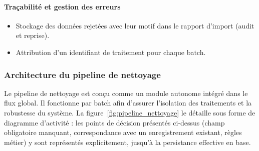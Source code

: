 \paragraph{Traçabilité et gestion des erreurs}
\begin{itemize}
    \item Stockage des données rejetées avec leur motif dans le rapport d'import (audit et reprise).

    \item Attribution d’un identifiant de traitement pour chaque batch.
\end{itemize}

\subsubsection{Architecture du pipeline de nettoyage}

Le pipeline de nettoyage est conçu comme un module autonome intégré dans le flux global. Il fonctionne par batch afin d’assurer l’isolation des traitements et la robustesse du système. La figure~\ref{fig:pipeline_nettoyage} le détaille sous forme de diagramme d'activité : les points de décision présentés ci-dessus (champ obligatoire manquant, correspondance avec un enregistrement existant, règles métier) y sont représentés explicitement, jusqu'à la persistance effective en base.

